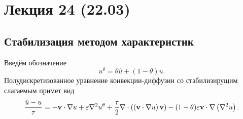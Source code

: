 \section{Лекция 24 (22.03)}

\subsection{Стабилизация методом характеристик}
\label{sec:char-stab}

Введём обозначение
$$
u^\theta = \theta \hat u + \left(1 - \theta\right) u.
$$
Полудискретизованное уравнение конвекции-диффузии со стабилизирущим слагаемым
примет вид
\begin{equation}
\label{eq:cg_stab_multidim}
\frac{\hat u - u}{\tau} =
-\boldsymbol{\rm v} \cdot \nabla u 
+\varepsilon \nabla^2 u^\theta
+\frac{\tau}{2} \nabla\cdot \left(\left(\boldsymbol{\rm v} \cdot \nabla u\right)\boldsymbol{\rm v}\right)
- (1-\theta)\varepsilon\boldsymbol{\rm v} \cdot \nabla\left(\nabla^2 u\right).
\end{equation}

